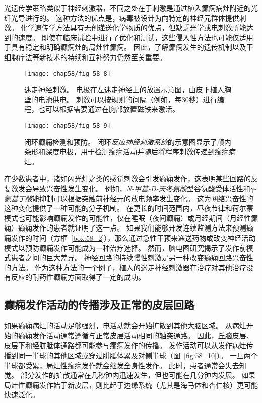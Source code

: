 \begin{proposition}[实时检测和预防癫痫的新方法]
	\quad \quad 光遗传学策略类似于神经刺激器，不同之处在于刺激是通过植入癫痫病灶附近的光纤光导进行的。
	这种方法的优点是，病毒被设计为向特定的神经元群体提供刺激。
	化学遗传学方法具有无创递送化学物质的优点，但缺乏光学或电刺激所能达到的速度。
	即使在临床试验中进行了优化和测试，这些侵入性方法也可能仅适用于具有稳定和明确癫痫灶的局灶性癫痫。
	因此，了解癫痫发生的遗传机制以及干细胞疗法等新技术的持续和互补努力仍然至关重要。
	
\end{proposition}


\begin{figure}[htbp]
	\centering
	\texttt{[image: chap58/fig\_58\_8]}
	\caption{迷走神经刺激。
		电极在左迷走神经上的放置示意图，由皮下植入胸壁的电池供电。
		刺激可以按规则的间隔（例如，每30秒）进行编程，也可以根据需要通过在胸部放置磁铁来激活\cite{stacey2008technology}。}
	\label{fig:58_8}
\end{figure}


\begin{figure}[htbp]
	\centering
	\texttt{[image: chap58/fig\_58\_9]}
	\caption{闭环癫痫检测和预防。
		闭环\textit{反应神经刺激系统}的示意图显示了颅内条形和深度电极，用于检测癫痫活动并随后将程序刺激传递到癫痫病灶\cite{heck2014two}。}
	\label{fig:58_9}
\end{figure}



在少数患者中，诸如闪光灯之类的感觉刺激会引发癫痫发作，这表明某些回路的反复激发会导致兴奋性发生变化。
例如，\textit{N-甲基-D-天冬氨酸}型谷氨酸受体活性和\textit{$\gamma$-氨基丁酸}能抑制可以根据突触前神经元的放电频率发生变化。
这为网络兴奋性的这种变化提供了一种可能的分子机制。
在更长的时间范围内，昼夜节律和荷尔蒙模式也可能影响癫痫发作的可能性，仅在睡眠（夜间癫痫）或月经期间（月经性癫痫）癫痫发作的患者就证明了这一点。
如果我们能够开发连续监测方法来预测癫痫发作的时间（方框~\ref{box:58_2}），那么通过急性干预来递送药物或改变神经活动模式以预防癫痫发作可能成为一种治疗选择。
然而，脑电图研究揭示了发作前模式患者之间的巨大差异。
神经回路的持续慢性刺激是另一种改变癫痫回路兴奋性的方法。
作为这种方法的一个例子，植入的迷走神经刺激器在治疗对其他治疗没有反应的耐药性癫痫方面取得了一定的成功。



\subsection{癫痫发作活动的传播涉及正常的皮层回路}

如果癫痫病灶的活动足够强烈，电活动就会开始扩散到其他大脑区域。
从病灶开始的癫痫发作活动通常遵循与正常皮层活动相同的轴突通路。
因此，丘脑皮层、皮层下和经胼胝体通路都可能参与癫痫发作的传播。
发作活动可以从发作病灶传播到同一半球的其他区域或穿过胼胝体累及对侧半球（图~\ref{fig:58_10}）。
一旦两个半球都受累，局灶性癫痫发作就会继发全身性发作。
此时，患者通常会失去知觉。
部分发作的扩散通常在几秒钟内迅速发生，但也可能在几分钟内发展。
如果局灶性癫痫发作始于新皮层，则比起于边缘系统（尤其是海马体和杏仁核）更可能快速泛化。


